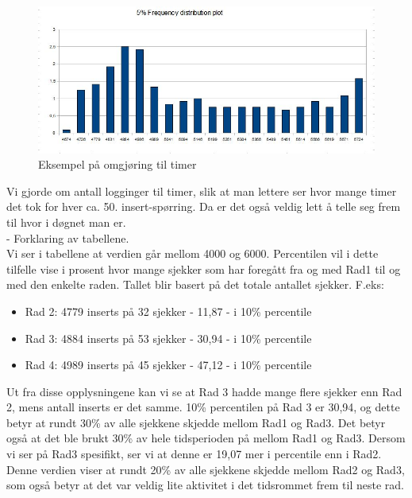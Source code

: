 \documentclass[a4paper, norsk, 12pt]{article}
\begin{document}
\begin{figure}[h!]
 \centering
  \includegraphics[width=1.0\textwidth]{Images/TF_timer.jpg}
 \caption{Eksempel på omgjøring til timer}
\end{figure}


Vi gjorde om antall logginger til timer, slik at man lettere ser hvor mange timer det tok for hver ca.  50. insert-spørring. Da er det også veldig lett å telle seg frem til hvor i døgnet man er.\\

- Forklaring av tabellene.\\
Vi ser i tabellene at verdien går mellom 4000 og 6000. Percentilen vil i dette tilfelle vise i prosent hvor mange sjekker som har foregått fra og med Rad1 til og med den enkelte raden. Tallet blir basert på det totale antallet sjekker. F.eks:
\begin{itemize}
\item Rad 2: 4779 inserts på 32 sjekker - 11,87 - i 10\% percentile
\item Rad 3: 4884 inserts på 53 sjekker - 30,94 - i 10\% percentile
\item Rad 4: 4989 inserts på 45 sjekker - 47,12 - i 10\% percentile
\end{itemize}

Ut fra disse opplysningene kan vi se at Rad 3 hadde mange flere sjekker enn Rad 2, mens antall inserts er det samme. 10\% percentilen på Rad 3 er 30,94, og dette betyr at rundt 30\% av alle sjekkene skjedde mellom Rad1 og Rad3. Det betyr også at det ble brukt 30\% av hele tidsperioden på mellom Rad1 og Rad3. Dersom vi ser på Rad3 spesifikt, ser vi at denne er 19,07 mer i percentile enn i Rad2. Denne verdien viser at rundt 20\% av alle sjekkene skjedde mellom Rad2 og Rad3, som også betyr at det var veldig lite aktivitet i det tidsrommet frem til neste rad.
\end{document}

